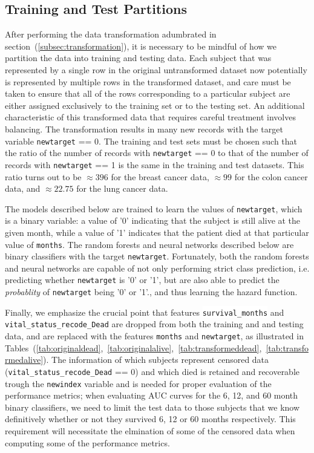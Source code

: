 \documentclass[a4paper,11pt]{article}
\newcommand{\codewhite}[1]{\colorbox{white}{\texttt{#1}}}
\begin{document}
\subsection{Training and Test Partitions}
\label{subsec:traintest}

After performing the data transformation adumbrated in section~(\ref{subsec:transformation}), it is necessary to be mindful of how we partition the data into training and testing data. Each subject that was represented by a single row in the original untransformed dataset now potentially is represented by multiple rows in the transformed dataset, and care must be taken to ensure that all of the rows corresponding to a particular subject are either assigned exclusively to the training set or to the testing set. 
An additional characteristic of this transformed data that requires careful treatment involves balancing. The transformation results in many new records with the target variable \codewhite{newtarget} == 0. The training and test sets must be chosen such that the ratio of the number of records with \codewhite{newtarget} == 0 to that of the number of records with \codewhite{newtarget} == 1 is the same in the training and test datasets.
This ratio turns out to be $\approx 396$ for the breast cancer data, $\approx  99$ for the colon cancer data, and 
$\approx 22.75$ for the lung cancer data. 


 
The models described below are trained to learn the values of \codewhite{newtarget}, which is a binary variable: a value of '0' indicating that the subject is still alive at the given month, while a value of '1' indicates that the patient died at that particular value of \codewhite{months}. The random forests and neural networks described below are binary classifiers with the target \codewhite{newtarget}. Fortunately, both the random forests and neural networks are capable of not only performing strict class prediction, i.e. predicting whether \codewhite{newtarget} is '0' or '1', but are also able to predict the \textit{probablity} of \codewhite{newtarget} being '0' or '1'., and thus learning the hazard function.


Finally, we emphasize the crucial point that features \codewhite{survival\_months} and \\
\codewhite{vital\_status\_recode\_Dead} are dropped from both the training and and testing data, and are replaced with the features \codewhite{months} and \codewhite{newtarget}, as illustrated in Tables~(\ref{tab:originaldead},~\ref{tab:originalalive},~\ref{tab:transformeddead},~\ref{tab:transformedalive}). The information of which subjects represent censored data (\codewhite{vital\_status\_recode\_Dead} == 0) and which died is retained and recoverable trough the \codewhite{newindex} variable and is needed for proper evaluation of the performance metrics; when evaluating AUC curves for the 6, 12, and 60 month binary classifiers, we need to limit the test data to those subjects that we know definitively whether or not they survived 6, 12 or 60 months respectively. This requirement will necessitate the elmination of some of the censored data when computing some of the performance metrics.
\end{document}

